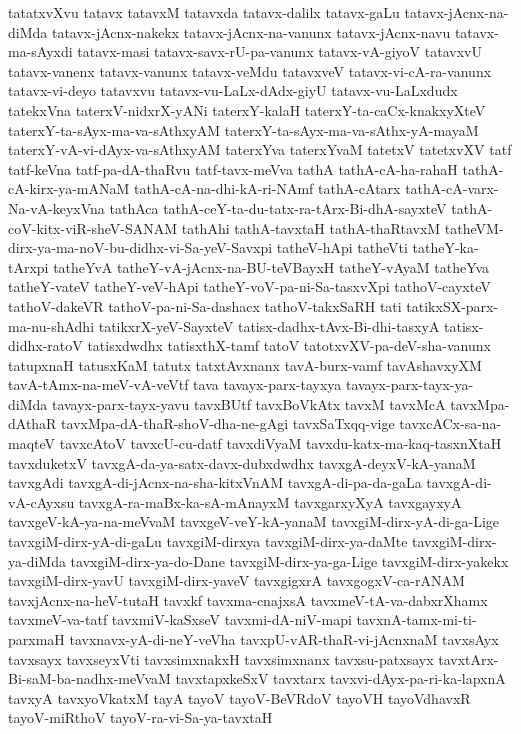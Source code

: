 {tatatxvXvu
tatavx
tatavxM
tatavxda
tatavx-dalilx
tatavx-gaLu
tatavx-jAcnx-na-diMda
tatavx-jAcnx-nakekx
tatavx-jAcnx-na-vanunx
tatavx-jAcnx-navu
tatavx-ma-sAyxdi
tatavx-masi
tatavx-savx-rU-pa-vanunx
tatavx-vA-giyoV
tatavxvU
tatavx-vanenx
tatavx-vanunx
tatavx-veMdu
tatavxveV
tatavx-vi-cA-ra-vanunx
tatavx-vi-deyo
tatavxvu
tatavx-vu-LaLx-dAdx-giyU
tatavx-vu-LaLxdudx
tatekxVna
taterxV-nidxrX-yANi
taterxY-kalaH
taterxY-ta-caCx-knakxyXteV
taterxY-ta-sAyx-ma-va-sAthxyAM
taterxY-ta-sAyx-ma-va-sAthx-yA-mayaM
taterxY-vA-vi-dAyx-va-sAthxyAM
taterxYva
taterxYvaM
tatetxV
tatetxvXV
tatf
tatf-keVna
tatf-pa-dA-thaRvu
tatf-tavx-meVva
tathA
tathA-cA-ha-rahaH
tathA-cA-kirx-ya-mANaM
tathA-cA-na-dhi-kA-ri-NAmf
tathA-cAtarx
tathA-cA-varx-Na-vA-keyxVna
tathAca
tathA-ceY-ta-du-tatx-ra-tArx-Bi-dhA-sayxteV
tathA-coV-kitx-viR-sheV-SANAM
tathAhi
tathA-tavxtaH
tathA-thaRtavxM
tatheVM-dirx-ya-ma-noV-bu-didhx-vi-Sa-yeV-Savxpi
tatheV-hApi
tatheVti
tatheY-ka-tArxpi
tatheYvA
tatheY-vA-jAcnx-na-BU-teVBayxH
tatheY-vAyaM
tatheYva
tatheY-vateV
tatheY-veV-hApi
tatheY-voV-pa-ni-Sa-tasxvXpi
tathoV-cayxteV
tathoV-dakeVR
tathoV-pa-ni-Sa-dashacx
tathoV-takxSaRH
tati
tatikxSX-parx-ma-nu-shAdhi
tatikxrX-yeV-SayxteV
tatisx-dadhx-tAvx-Bi-dhi-tasxyA
tatisx-didhx-ratoV
tatisxdwdhx
tatisxthX-tamf
tatoV
tatotxvXV-pa-deV-sha-vanunx
tatupxnaH
tatusxKaM
tatutx
tatxtAvxnanx
tavA-burx-vamf
tavAshavxyXM
tavA-tAmx-na-meV-vA-veVtf
tava
tavayx-parx-tayxya
tavayx-parx-tayx-ya-diMda
tavayx-parx-tayx-yavu
tavxBUtf
tavxBoVkAtx
tavxM
tavxMcA
tavxMpa-dAthaR
tavxMpa-dA-thaR-shoV-dha-ne-gAgi
tavxSaTxqq-vige
tavxcACx-sa-na-maqteV
tavxcAtoV
tavxcU-cu-datf
tavxdiVyaM
tavxdu-katx-ma-kaq-tasxnXtaH
tavxduketxV
tavxgA-da-ya-satx-davx-dubxdwdhx
tavxgA-deyxV-kA-yanaM
tavxgAdi
tavxgA-di-jAcnx-na-sha-kitxVnAM
tavxgA-di-pa-da-gaLa
tavxgA-di-vA-cAyxsu
tavxgA-ra-maBx-ka-sA-mAnayxM
tavxgarxyXyA
tavxgayxyA
tavxgeV-kA-ya-na-meVvaM
tavxgeV-veY-kA-yanaM
tavxgiM-dirx-yA-di-ga-Lige
tavxgiM-dirx-yA-di-gaLu
tavxgiM-dirxya
tavxgiM-dirx-ya-daMte
tavxgiM-dirx-ya-diMda
tavxgiM-dirx-ya-do-Dane
tavxgiM-dirx-ya-ga-Lige
tavxgiM-dirx-yakekx
tavxgiM-dirx-yavU
tavxgiM-dirx-yaveV
tavxgigxrA
tavxgogxV-ca-rANAM
tavxjAcnx-na-heV-tutaH
tavxkf
tavxma-cnajxsA
tavxmeV-tA-va-dabxrXhamx
tavxmeV-va-tatf
tavxmiV-kaSxseV
tavxmi-dA-niV-mapi
tavxnA-tamx-mi-ti-parxmaH
tavxnavx-yA-di-neY-veVha
tavxpU-vAR-thaR-vi-jAcnxnaM
tavxsAyx
tavxsayx
tavxseyxVti
tavxsimxnakxH
tavxsimxnanx
tavxsu-patxsayx
tavxtArx-Bi-saM-ba-nadhx-meVvaM
tavxtapxkeSxV
tavxtarx
tavxvi-dAyx-pa-ri-ka-lapxnA
tavxyA
tavxyoVkatxM
tayA
tayoV
tayoV-BeVRdoV
tayoVH
tayoVdhavxR
tayoV-miRthoV
tayoV-ra-vi-Sa-ya-tavxtaH
}
